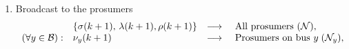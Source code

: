 \documentclass[10pt]{article}
\newtheorem{assumption}{Assumption}{\it}{}
\newcommand{\mc}{\mathcal}
\newcommand{\bb}{\mathbb}
\newcommand{\0}{\mathbf{0}}
\newcommand{\1}{\mathbf{1}}
\begin{document}
\begin{enumerate}[(1)]
	 \smallskip
	 \item Broadcast to the prosumers
	 	\begin{align*}
	\begin{array}{c l c l }
& \{ \sigma(k+1), \, \lambda(k+1), \rho(k+1) \} &
	\longrightarrow & \text{ All prosumers }(\mc N), \\
 (\forall y \in \mc B): &	\nu_y(k+1)  &	\longrightarrow & \text{ Prosumers on bus } y \; (\mc N_y),  
	\end{array}
     	\end{align*}
	
	\end{enumerate}



%
%
%
\end{document}
